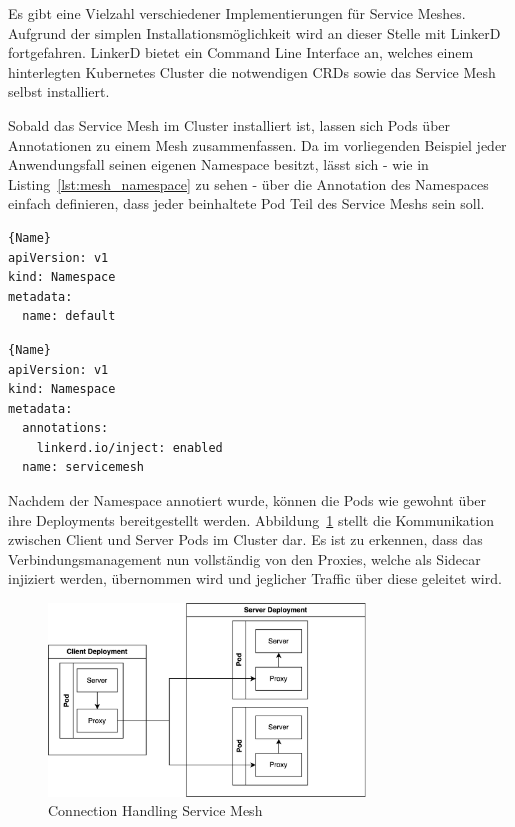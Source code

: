 Es gibt eine Vielzahl verschiedener Implementierungen für Service Meshes.
Aufgrund der simplen Installationsmöglichkeit wird an dieser Stelle mit LinkerD fortgefahren.
LinkerD bietet ein Command Line Interface an, welches einem hinterlegten Kubernetes Cluster die notwendigen CRDs sowie das Service Mesh selbst installiert.

Sobald das Service Mesh im Cluster installiert ist, lassen sich Pods über Annotationen zu einem Mesh zusammenfassen.
Da im vorliegenden Beispiel jeder Anwendungsfall seinen eigenen Namespace besitzt, lässt sich - wie in Listing~\ref{lst:mesh_namespace} zu sehen - über die Annotation des Namespaces einfach definieren, dass jeder beinhaltete Pod Teil des Service Meshs sein soll.

\begin{minipage}{.4\linewidth}
             \begin{lstlisting}[caption=Default Namespace,frame=tlrb,label={lst:default_namespace}]{Name}
apiVersion: v1
kind: Namespace
metadata:
  name: default
             \end{lstlisting}
\end{minipage}\hfill
\begin{minipage}{.49\linewidth}
             \begin{lstlisting}[caption=Service Mesh Namespace,frame=tlrb,label={lst:mesh_namespace}]{Name}
apiVersion: v1
kind: Namespace
metadata:
  annotations:
    linkerd.io/inject: enabled
  name: servicemesh
             \end{lstlisting}
\end{minipage}\hfill

Nachdem der Namespace annotiert wurde, können die Pods wie gewohnt über ihre Deployments bereitgestellt werden. Abbildung~\ref{fig:mesh_loadbalancing} stellt die Kommunikation zwischen Client und Server Pods im Cluster dar.
Es ist zu erkennen, dass das Verbindungsmanagement nun vollständig von den Proxies, welche als Sidecar injiziert werden, übernommen wird und jeglicher Traffic über diese geleitet wird.

\begin{figure}[H]
    \centering
    \includegraphics[width=0.75\textwidth]{img/mesh_loadbalancing}
    \caption{Connection Handling Service Mesh}
    \label{fig:mesh_loadbalancing}
\end{figure}

